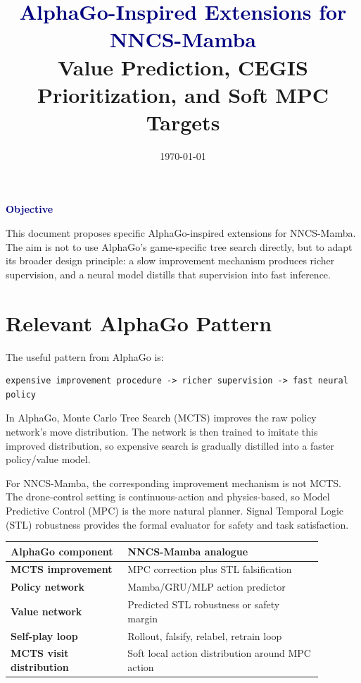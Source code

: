\documentclass[11pt]{article}
\title{
  \vspace{-1.2cm}
  \textbf{\textcolor{navy}{AlphaGo-Inspired Extensions for NNCS-Mamba}}\\
  \large Value Prediction, CEGIS Prioritization, and Soft MPC Targets
}
\author{}
\date{\today}
\newcommand{\reportbox}[2]{
  \vspace{4pt}
  \noindent\colorbox{softgray}{
    \parbox{\dimexpr0.98\linewidth-2\fboxsep\relax}{
      \textbf{\textcolor{navy}{#1}}\par
      #2
    }
  }
  \vspace{4pt}
}
\begin{document}
\maketitle
\thispagestyle{fancy}

\reportbox{Objective}{
This document proposes specific AlphaGo-inspired extensions for NNCS-Mamba. The aim is not to use AlphaGo's game-specific tree search directly, but to adapt its broader design principle: a slow improvement mechanism produces richer supervision, and a neural model distills that supervision into fast inference.
}

\section{Relevant AlphaGo Pattern}

The useful pattern from AlphaGo is:

\begin{lstlisting}
expensive improvement procedure -> richer supervision -> fast neural policy
\end{lstlisting}

In AlphaGo, Monte Carlo Tree Search (MCTS) improves the raw policy network's move distribution. The network is then trained to imitate this improved distribution, so expensive search is gradually distilled into a faster policy/value model.

For NNCS-Mamba, the corresponding improvement mechanism is not MCTS. The drone-control setting is continuous-action and physics-based, so Model Predictive Control (MPC) is the more natural planner. Signal Temporal Logic (STL) robustness provides the formal evaluator for safety and task satisfaction.

\begin{center}
\begin{tabular}{>{\bfseries}p{0.33\linewidth}p{0.55\linewidth}}
\toprule
AlphaGo component & NNCS-Mamba analogue \\
\midrule
MCTS improvement & MPC correction plus STL falsification \\
Policy network & Mamba/GRU/MLP action predictor \\
Value network & Predicted STL robustness or safety margin \\
Self-play loop & Rollout, falsify, relabel, retrain loop \\
MCTS visit distribution & Soft local action distribution around MPC action \\
\bottomrule
\end{tabular}
\end{center}
\end{document}
